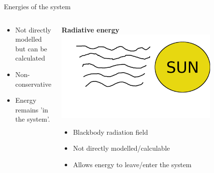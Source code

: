 \documentclass[10pt,aspectratio=169,usenames,dvipsnames]{beamer}
\begin{document}
\begin{frame}{Energies of the system}
\begin{columns}
\begin{column}{0.3\textwidth}
\begin{itemize}
    \item Not directly modelled but can be calculated
    \item Non-conservative 
    \item Energy remains 'in the system'.
\end{itemize}
\end{column}
\begin{column}{0.3\textwidth}
\centering
\textbf{Radiative energy}
\includegraphics[width=0.8\textwidth, trim=0cm 2cm 0cm 0cm,clip]{2023ECRW/Figures/radiationenergy.png}
\begin{itemize}
    \item Blackbody radiation field
    \item Not directly modelled/calculable 
    \item Allows energy to leave/enter the system
\end{itemize}
\end{column}
\end{columns}
\end{frame}
\end{document}
